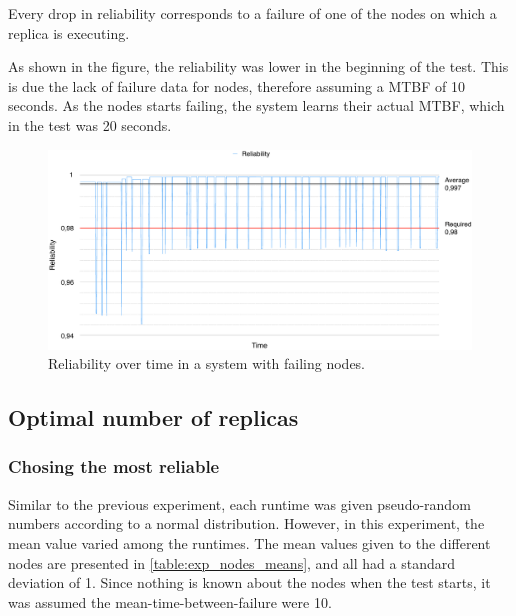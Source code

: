 \documentclass{cslthse-msc}
\begin{document}
Every drop in reliability corresponds to a failure of one of the nodes on which a replica is executing.

As shown in the figure, the reliability was lower in the beginning of the test. This is due the lack of failure data for nodes, therefore assuming a MTBF of 10 seconds. As the nodes starts failing, the system learns their actual MTBF, which in the test was 20 seconds.

\begin{figure}[!hbt]
\centering
\includegraphics[scale=0.5]{images/results/reliability.pdf}
\caption{Reliability over time in a system with failing nodes.} \label{fig:exp_reliability_level}
\end{figure}

\subsection{Optimal number of replicas}
\subsubsection{Chosing the most reliable} \label{sec:eval_opt_nbr_replicas}
Similar to the previous experiment, each runtime was given pseudo-random numbers according to a normal distribution. However, in this experiment, the mean value varied among the runtimes. The mean values given to the different nodes are presented in \cref{table:exp_nodes_means}, and all had a standard deviation of 1. Since nothing is known about the nodes when the test starts, it was assumed the mean-time-between-failure were 10. 
\end{document}
